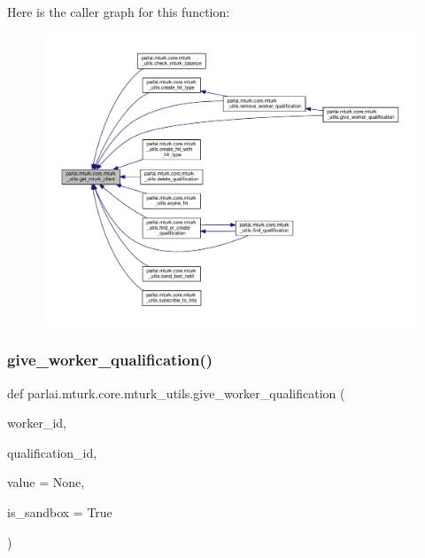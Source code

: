 Here is the caller graph for this function\+:
\nopagebreak
\begin{figure}[H]
\begin{center}
\leavevmode
\includegraphics[width=350pt]{namespaceparlai_1_1mturk_1_1core_1_1mturk__utils_a577e2527c04682284394b0951a090695_icgraph}
\end{center}
\end{figure}
\mbox{\label{namespaceparlai_1_1mturk_1_1core_1_1mturk__utils_a640e2d9d121507f92649cccbd27e3af9}} 
\subsubsection{\texorpdfstring{give\+\_\+worker\+\_\+qualification()}{give\_worker\_qualification()}}
{\footnotesize\ttfamily def parlai.\+mturk.\+core.\+mturk\+\_\+utils.\+give\+\_\+worker\+\_\+qualification (\begin{DoxyParamCaption}\item[{}]{worker\+\_\+id,  }\item[{}]{qualification\+\_\+id,  }\item[{}]{value = {\ttfamily None},  }\item[{}]{is\+\_\+sandbox = {\ttfamily True} }\end{DoxyParamCaption})}

